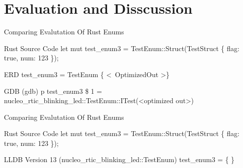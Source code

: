 \section{Evaluation and Disscussion}

\begin{frame}{Comparing Evalutation Of Rust Enums}
	\begin{alertblock}{Rust Source Code}
		let mut test\_enum3 = TestEnum::Struct(TestStruct \{ flag: true, num: 123 \});
    	\end{alertblock}

	\begin{block}{ERD}
		test\_enum3 = TestEnum \{ \textless \ OptimizedOut \textgreater \}
    	\end{block}

    	\begin{block}{GDB}
		(gdb) p test\_enum3\newline
		\$ 1 = nucleo\_rtic\_blinking\_led::TestEnum::ITest(\textless optimized out\textgreater)
    	\end{block}
\end{frame}


\begin{frame}{Comparing Evalutation Of Rust Enums}
	
	\begin{alertblock}{Rust Source Code}
		let mut test\_enum3 = TestEnum::Struct(TestStruct \{ flag: true, num: 123 \});
    	\end{alertblock}

    	\begin{block}{LLDB Version 13}
		(nucleo\_rtic\_blinking\_led::TestEnum) test\_enum3 = \{\newline
		\newline
		\newline
		\newline
		\newline
		\text{\ \ \}}\newline
		\newline
		\newline
		\}
    	\end{block}

\end{frame}

